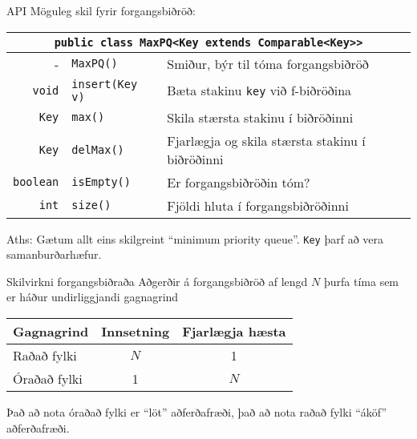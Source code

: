 \documentclass{beamer}
\begin{document}
\begin{frame}{API}
	Möguleg skil fyrir forgangsbiðröð:
	\begin{center}
		\begin{tabularx}{\textwidth}{rlX}
			\toprule
			\multicolumn{3}{c}{\texttt{public class MaxPQ<Key extends Comparable<Key>>}}                \\
			\midrule
			-                & \texttt{MaxPQ()}       & Smiður, býr til tóma forgangsbiðröð             \\
			\texttt{void}    & \texttt{insert(Key v)} & Bæta stakinu \texttt{key} við f-biðröðina       \\
			\texttt{Key}     & \texttt{max()}         & Skila stærsta stakinu í biðröðinni              \\
			\texttt{Key}     & \texttt{delMax()}      & Fjarlægja og skila stærsta stakinu í biðröðinni \\
			\texttt{boolean} & \texttt{isEmpty()}     & Er forgangsbiðröðin tóm?                        \\
			\texttt{int}     & \texttt{size()}        & Fjöldi hluta í forgangsbiðröðinni               \\
			\bottomrule
		\end{tabularx}
	\end{center}
	Aths: Gætum allt eins skilgreint ``minimum priority queue''. \texttt{Key} þarf að vera samanburðarhæfur.
\end{frame}

\begin{frame}{Skilvirkni forgangsbiðraða}
	Aðgerðir á forgangsbiðröð af lengd $N$ þurfa tíma sem er háður undirliggjandi gagnagrind
	\begin{center}
		\begin{tabular}{lcc}
			\toprule
			Gagnagrind   & Innsetning & Fjarlægja hæsta \\
			\midrule
			Raðað fylki  & $N$        & 1               \\
			Óraðað fylki & 1          & $N$             \\
			\bottomrule
		\end{tabular}
	\end{center}
	Það að nota óraðað fylki er ``löt'' aðferðafræði, það að nota raðað fylki ``áköf'' aðferðafræði.
\end{frame}

\end{document}

